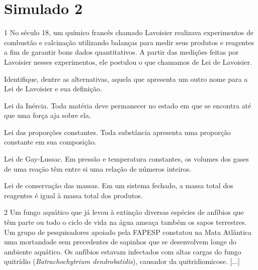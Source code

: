 \chapter{Simulado 2}

\num{1}
  No século 18, um químico francês chamado Lavoisier realizava experimentos de combustão e calcinação utilizando balanças para medir
  seus produtos e reagentes a fim de garantir bons dados quantitativos. A
  partir das medições feitas por Lavoisier nesses experimentos, ele
  postulou o que chamamos de Lei de Lavoisier.


Identifique, dentre as alternativas, aquela que apresenta um outro nome para a Lei de Lavoisier e sua definição.

\begin{escolha}
\item
  Lei da Inércia. Toda matéria deve permanecer no estado em que se
  encontra até que uma força aja sobre ela.
\item
  Lei das proporções constantes. Toda substância apresenta uma proporção
  constante em sua composição.
\item
  Lei de Gay-Lussac. Em pressão e temperatura constantes, os volumes dos
  gases de uma reação têm entre si uma relação de números inteiros.
\item
  Lei de conservação das massas. Em um sistema fechado, a massa total dos
  reagentes é igual à massa total dos produtos.
\end{escolha}


\num{2}
  Um fungo aquático que já levou à extinção diversas espécies de
  anfíbios que têm parte ou todo o ciclo de vida na água ameaça também
  os sapos terrestres. Um grupo de pesquisadores apoiado pela FAPESP
  constatou na Mata Atlântica uma mortandade sem precedentes de sapinhos
  que se desenvolvem longe do ambiente aquático. Os anfíbios estavam
  infectados com altas cargas do fungo quitrídio (\emph{Batrachochytrium
  dendrobatidis}), causador da quitridiomicose. [...]

